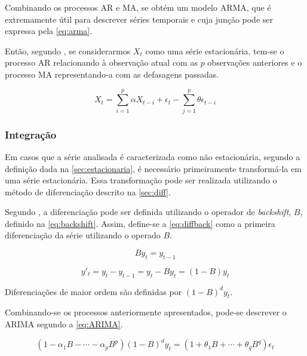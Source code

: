 \documentclass[
    12pt,
    oneside,
    a4paper,
    english,
    brazil
]{abntex2}
\begin{document}
Combinando os processos AR e MA, se obtém um modelo ARMA, que é extremamente útil para
descrever séries temporais e cuja junção pode  ser expressa  pela
\autoref{eq:arma}.

Então, segundo , se  considerarmos $X_t$ como uma
série estacionária, tem-se  o processo AR relacionando à observação atual com
as  $p$ observações  anteriores e o  processo MA  representando-a com as  defasagens
passadas.

\begin{equation}
    \label{eq:arma}
    X_t = \sum_{i = 1}^{p}{\alpha X_{t-i}} + \epsilon_t - \sum_{j = 1}^{p}{\theta \epsilon_{t-i}}
\end{equation}

\subsubsection{Integração}

Em  casos  que a  série  analisada  é caracterizada  como não estacionária, segundo  a
definição dada  na \autoref{sec:estacionaria}, é necessário primeiramente transformá-la em
uma série estacionária. Essa transformação pode ser realizada utilizando o método
de  diferenciação  descrito na  \autoref{sec:diff}.

Segundo , a diferenciação pode ser definida utilizando o operador
de \textit{backshift}, $B$, definido na \autoref{eq:backshift}. Assim, define-se
a \autoref{eq:diffback}  como a  primeira diferenciação  da série  utilizando o
operado $B$.

\begin{equation}
    \label{eq:backshift}
    By_t = y_{t-1}
\end{equation}

\begin{equation}
    \label{eq:diffback}
    y'_t = y_t - y_{t-1} = y_t - By_t = (1-B)y_t
\end{equation}

Diferenciações de maior ordem são definidas por $(1-B)^dy_t$.

Combinando-se  os  processos anteriormente apresentados,  pode-se  descrever  o ARIMA  segundo  a
\autoref{eq:ARIMA}.

\begin{equation}
    \label{eq:ARIMA}
    (1 - \alpha_1B-\cdots-\alpha_pB^p)(1-B)^dy_t=(1+\theta_1B+\cdots+\theta_qB^q)\epsilon_t
\end{equation}
\end{document}
